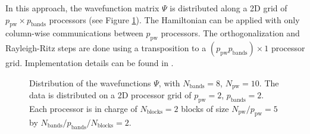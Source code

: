 \documentclass[11pt]{elsarticle}
\newcommand{\npw}{\ensuremath{N_{\text{pw}}}\xspace}
\newcommand{\nband}{\ensuremath{N_{\text{bands}}}\xspace}
\newcommand{\nblocks}{\ensuremath{N_{\text{blocks}}}\xspace}
\newcommand{\nppw}{\ensuremath{p_{\text{pw}}}\xspace}
\newcommand{\npband}{\ensuremath{p_{\text{bands}}}\xspace}
\begin{document}
In this approach, the wavefunction matrix $\Psi$ is distributed along
a 2D grid of $\nppw \times \npband$ processors (see Figure
\ref{fig:distribution}). The Hamiltonian can be applied with only
column-wise communications between $\nppw$ processors. The
orthogonalization and Rayleigh-Ritz steps are done using a
transposition to a $(\nppw \npband) \times 1$ processor
grid. Implementation details can be found in \cite{bottin2008large}.

\begin{figure}[h!]
  \centering
  \caption{Distribution of the wavefunctions $\Psi$, with $\nband = 8$,
    $\npw = 10$. The data is distributed on a 2D processor grid of $\nppw = 2$,
    $\npband = 2$. Each processor is in charge of $\nblocks = 2$ blocks
    of size $\npw / \nppw = 5$ by $\nband / \npband / \nblocks = 2$.}
  \label{fig:distribution}
\end{figure}
\end{document}
